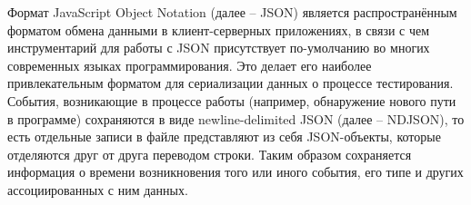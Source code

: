 Формат JavaScript Object Notation (далее -- JSON) является распространённым форматом обмена данными в клиент-серверных приложениях, в связи с чем инструментарий для работы с JSON присутствует по-умолчанию во многих современных языках программирования. Это делает его наиболее привлекательным форматом для сериализации данных о процессе тестирования. События, возникающие в процессе работы (например, обнаружение нового пути в программе) сохраняются в виде newline-delimited JSON (далее -- NDJSON), то есть отдельные записи в файле представляют из себя JSON-объекты, которые отделяются друг от друга переводом строки. Таким образом сохраняется информация о времени возникновения того или иного события, его типе и других ассоциированных с ним данных.